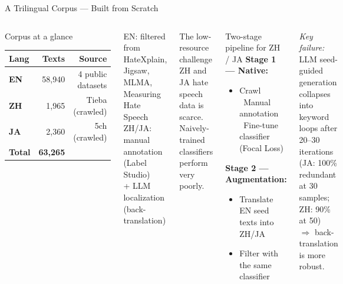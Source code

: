 \documentclass[aspectratio=169,10pt]{beamer}
\begin{document}
\begin{frame}{A Trilingual Corpus --- Built from Scratch}
  \begin{columns}[T]
      \begin{block}{Corpus at a glance}
        \centering\vspace{4pt}
        \begin{tabular}{lrr}
          \toprule
          Lang & Texts & Source \\
          \midrule
          \textbf{EN} & 58,940 & 4 public datasets \\
          \textbf{ZH} & 1,965  & Tieba (crawled) \\
          \textbf{JA} & 2,360  & 5ch (crawled) \\
          \midrule
          \textbf{Total} & \textbf{63,265} & \\
          \bottomrule
        \end{tabular}
        \vspace{4pt}
      \end{block}
      \vspace{4pt}
      \footnotesize
      EN: filtered from HateXplain, Jigsaw,\\
      MLMA, Measuring Hate Speech\\[4pt]
      ZH/JA: manual annotation (Label Studio)\\
      + LLM localization (back-translation)
      \begin{alertblock}{The low-resource challenge}
        ZH and JA hate speech data is scarce.\\
        Naively-trained classifiers perform very poorly.
      \end{alertblock}
      \vspace{6pt}
      \begin{block}{Two-stage pipeline for ZH / JA}
        \textbf{Stage 1 --- Native:}
        \begin{itemize}\small
          \item Crawl \textrightarrow\ Manual annotation \textrightarrow\ Fine-tune classifier (Focal Loss)
        \end{itemize}
        \textbf{Stage 2 --- Augmentation:}
        \begin{itemize}\small
          \item Translate EN seed texts into ZH/JA
          \item Filter with the same classifier
        \end{itemize}
      \end{block}
      \vspace{4pt}
      \footnotesize\color{accent}
      \textit{Key failure:} LLM seed-guided generation collapses into\\
      keyword loops after 20--30 iterations\\
      (JA: 100\% redundant at 30 samples; ZH: 90\% at 50)\\
      $\Rightarrow$ back-translation is more robust.
  \end{columns}
\end{frame}
\end{document}
